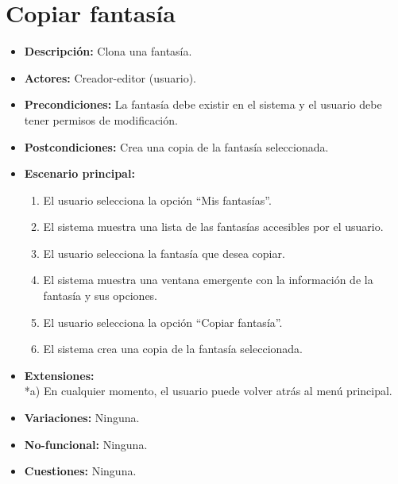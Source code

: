\section{Copiar fantasía}
\begin{itemize}
	\item \textbf{Descripción:} Clona una fantasía.
	\item \textbf{Actores:} Creador-editor (usuario).
	\item \textbf{Precondiciones:} La fantasía debe existir en el sistema y el usuario debe tener permisos de modificación.
	\item \textbf{Postcondiciones:} Crea una copia de la fantasía seleccionada.
	\item \textbf{Escenario principal:}
	\begin{enumerate}
		\item El usuario selecciona la opción ``Mis fantasías''.
		\item El sistema muestra una lista de las fantasías accesibles por el usuario.
		\item El usuario selecciona la fantasía que desea copiar.
		\item El sistema muestra una ventana emergente con la información de la fantasía y sus opciones.
		\item El usuario selecciona la opción ``Copiar fantasía''.
		\item El sistema crea una copia de la fantasía seleccionada.
	\end{enumerate}
	\item \textbf{Extensiones:} \\ *a) En cualquier momento, el usuario puede volver atrás al menú principal.
	\item \textbf{Variaciones:} Ninguna.
	\item \textbf{No-funcional:} Ninguna.
	\item \textbf{Cuestiones:} Ninguna.
\end{itemize}

